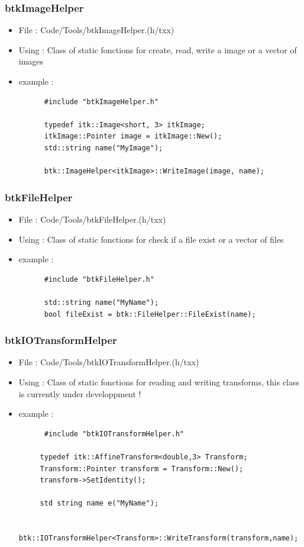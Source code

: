     \subsubsection{btkImageHelper}
    \begin{itemize}
    \item File : Code/Tools/btkImageHelper.(h/txx)
    \item Using : Class of static fonctions for create, read, write a image or a vector of images
    \item example :
      \begin{verbatim}
      #include "btkImageHelper.h"
                 
      typedef itk::Image<short, 3> itkImage;
      itkImage::Pointer image = itkImage::New();
      std::string name("MyImage");

      btk::ImageHelper<itkImage>::WriteImage(image, name);

      \end{verbatim}
    \end{itemize}

    \subsubsection{btkFileHelper}
    \begin{itemize}
    \item File : Code/Tools/btkFileHelper.(h/txx)
    \item Using : Class of static fonctions for check if a file exist or a vector of files
    \item example :
      \begin{verbatim}
      #include "btkFileHelper.h"

      std::string name("MyName");
      bool fileExist = btk::FileHelper::FileExist(name);
      \end{verbatim}

    \end{itemize}

    \subsubsection{btkIOTransformHelper}
    \begin{itemize}
    \item File : Code/Tools/btkIOTransformHelper.(h/txx)
    \item Using : Class of static fonctions for reading and writing transforms, this class is currently under developpment !
    \item example :
      \begin{verbatim}
      #include "btkIOTransformHelper.h"

     typedef itk::AffineTransform<double,3> Transform;
     Transform::Pointer transform = Transform::New();
     transform->SetIdentity();

     std string name e("MyName");

     btk::IOTransformHelper<Transform>::WriteTransform(transform,name);
      
      \end{verbatim}

    \end{itemize}

